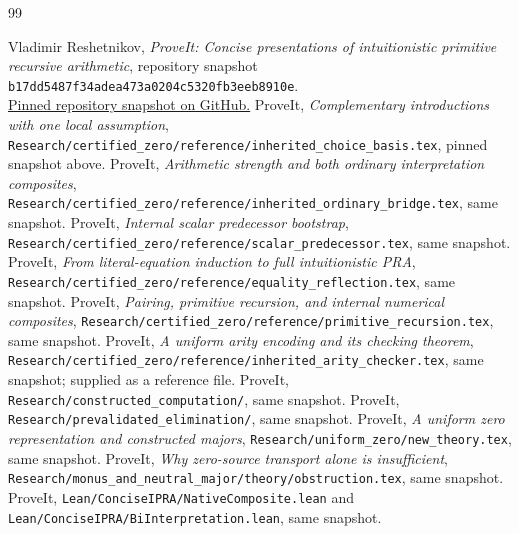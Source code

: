 \documentclass[11pt]{article}
\theoremstyle{definition}\newtheorem{definition}[theorem]{Definition}
\theoremstyle{remark}\newtheorem{remark}[theorem]{Remark}
\newcommand{\file}[1]{\texttt{#1}}
\begin{document}
\clearpage
\begin{thebibliography}{99}
\small\raggedright
{} Vladimir Reshetnikov, \emph{ProveIt: Concise presentations of intuitionistic primitive recursive arithmetic}, repository snapshot
\texttt{b17dd5487f34adea473a0204c5320fb3eeb8910e}.\\
\href{https://github.com/VladimirReshetnikov/ProveIt/tree/b17dd5487f34adea473a0204c5320fb3eeb8910e/Logic/PrimitiveRecursiveArithmetic/ConciseIPRA}{Pinned repository snapshot on GitHub.}
 ProveIt, \emph{Complementary introductions with one local assumption},
\file{Research/certified\_zero/reference/inherited\_choice\_basis.tex}, pinned snapshot above.
 ProveIt, \emph{Arithmetic strength and both ordinary interpretation composites},
\file{Research/certified\_zero/reference/inherited\_ordinary\_bridge.tex}, same snapshot.
 ProveIt, \emph{Internal scalar predecessor bootstrap},
\file{Research/certified\_zero/reference/scalar\_predecessor.tex}, same snapshot.
 ProveIt, \emph{From literal-equation induction to full intuitionistic PRA},
\file{Research/certified\_zero/reference/equality\_reflection.tex}, same snapshot.
 ProveIt, \emph{Pairing, primitive recursion, and internal numerical composites},
\file{Research/certified\_zero/reference/primitive\_recursion.tex}, same snapshot.
 ProveIt, \emph{A uniform arity encoding and its checking theorem},
\file{Research/certified\_zero/reference/inherited\_arity\_checker.tex}, same snapshot; supplied as a reference file.
 ProveIt, \file{Research/constructed\_computation/}, same snapshot.
 ProveIt, \file{Research/prevalidated\_elimination/}, same snapshot.
 ProveIt, \emph{A uniform zero representation and constructed majors},
\file{Research/uniform\_zero/new\_theory.tex}, same snapshot.
 ProveIt, \emph{Why zero-source transport alone is insufficient},
\file{Research/monus\_and\_neutral\_major/theory/obstruction.tex}, same snapshot.
 ProveIt, \file{Lean/ConciseIPRA/NativeComposite.lean} and
\file{Lean/ConciseIPRA/BiInterpretation.lean}, same snapshot.
\end{thebibliography}
\end{document}
